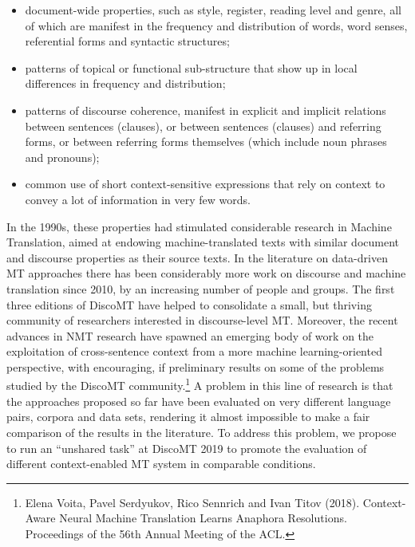 \documentclass[11pt]{article}
\begin{document}
\begin{itemize}
\item document-wide properties, such as style, register,
  reading level and genre, all of which are manifest in the frequency
  and distribution of words, word senses, referential forms and
  syntactic structures; 
\item patterns of topical or functional sub-structure that show up
   in local differences in frequency and distribution;
\item patterns of discourse coherence, manifest in explicit and
  implicit relations between sentences (clauses), or between
  sentences (clauses) and referring forms, or between referring forms
  themselves (which include noun phrases and pronouns);
\item common use of short context-sensitive expressions that rely on
  context to convey a lot of information in very few words.
\end{itemize}

In the 1990s, these properties had stimulated considerable research in Machine
Translation, aimed at endowing machine-translated texts with similar document
and discourse properties as their source texts.
% 
% 
In the literature on data-driven MT approaches there has been considerably more
work on discourse and machine translation since 2010, by an increasing number of
people and groups. The first three editions of DiscoMT have helped to
consolidate a small, but thriving community of researchers interested in
discourse-level MT. Moreover, the recent advances in NMT research have spawned
an emerging body of work on the exploitation of cross-sentence context from a
more machine learning-oriented perspective, with encouraging, if preliminary
results on some of the problems studied by the DiscoMT community.\footnote{Elena
Voita, Pavel Serdyukov, Rico Sennrich and Ivan Titov (2018). Context-Aware
Neural Machine Translation Learns Anaphora Resolutions. Proceedings of the 56th
Annual Meeting of the ACL.} A problem in this line of research is that the
approaches proposed so far have been evaluated on very different language pairs,
corpora and data sets, rendering it almost impossible to make a fair comparison
of the results in the literature. To address this problem, we propose to run an
``unshared task'' at DiscoMT 2019 to promote the evaluation of different
context-enabled MT system in comparable conditions.
\end{document}
